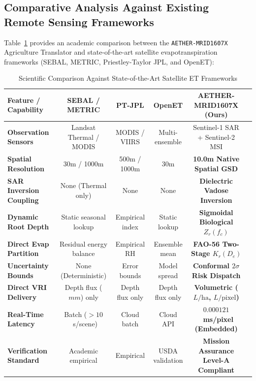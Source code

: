 \documentclass[11pt,a4paper]{article}
\theoremstyle{definition}
\theoremstyle{remark}
\begin{document}
\subsection{Comparative Analysis Against Existing Remote Sensing Frameworks}
Table~\ref{tab:comparison_lit} provides an academic comparison between the \texttt{AETHER-MRID1607X} Agriculture Translator and state-of-the-art satellite evapotranspiration frameworks (SEBAL, METRIC, Priestley-Taylor JPL, and OpenET):

\begin{table}[htbp]
\centering
\caption{Scientific Comparison Against State-of-the-Art Satellite ET Frameworks}
\label{tab:comparison_lit}
\small
\begin{tabular}{lccccc}
\toprule
\textbf{Feature / Capability} & \textbf{SEBAL / METRIC} & \textbf{PT-JPL} & \textbf{OpenET} & \textbf{AETHER-MRID1607X (Ours)} \\
\midrule
\textbf{Observation Sensors}   & Landsat Thermal / MODIS & MODIS / VIIRS   & Multi-ensemble  & Sentinel-1 SAR + Sentinel-2 MSI \\
\textbf{Spatial Resolution}    & 30m / 1000m             & 500m / 1000m    & 30m             & \textbf{10.0m Native Spatial GSD} \\
\textbf{SAR Inversion Coupling}& None (Thermal only)     & None            & None            & \textbf{Dielectric Vadose Inversion} \\
\textbf{Dynamic Root Depth}    & Static seasonal lookup  & Empirical index & Static lookup   & \textbf{Sigmoidal Biological $Z_r(f_c)$} \\
\textbf{Direct Evap Partition} & Residual energy balance & Empirical RH    & Ensemble mean   & \textbf{FAO-56 Two-Stage $K_r(D_e)$} \\
\textbf{Uncertainty Bounds}    & None (Deterministic)    & Error bounds    & Model spread    & \textbf{Conformal $2\sigma$ Risk Dispatch} \\
\textbf{Direct VRI Delivery}   & Depth flux ($mm$) only  & Depth flux only & Depth flux only & \textbf{Volumetric ($L/\text{ha}$, $L/\text{pixel}$)} \\
\textbf{Real-Time Latency}     & Batch ($> 10$~s/scene)  & Cloud batch     & Cloud API       & \textbf{$0.000121$~ms/pixel (Embedded)} \\
\textbf{Verification Standard} & Academic empirical      & Empirical       & USDA validation & \textbf{Mission Assurance Level-A Compliant} \\
\bottomrule
\end{tabular}
\end{table}
\end{document}
